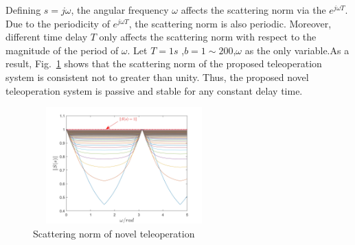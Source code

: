 \par Defining $s = j\omega$,
the angular frequency $\omega$ affects the scattering norm via the $e^{j\omega T}$.
Due to the periodicity of $e^{j\omega T}$, the scattering norm is also periodic.
Moreover, different time delay $T$
only affects the scattering norm with respect to the magnitude of the period of $\omega$.
Let $T = 1s$ ,$b=1 \sim 200$,$\omega$ as the only variable.As a result,
Fig.~\ref{fig5} shows that the scattering norm of
the proposed teleoperation system is consistent not to greater than unity.
Thus, the proposed novel teleoperation system is passive and stable for any constant delay time.
\begin{figure}[htbp]
    \centerline{\includegraphics[height=4.5cm,width=7cm]{S(s).jpg}}
    \caption{Scattering norm of novel teleoperation}
    \label{fig5}
\end{figure}
